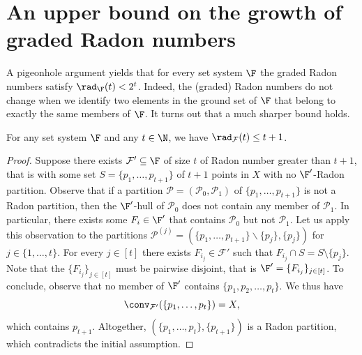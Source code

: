 \section{An upper bound on the growth of graded Radon numbers}\label{app:rab}
%
A pigeonhole argument yields that for every set system $\F$ the graded Radon numbers satisfy $\rad_\F(t)< 2^t$. Indeed, the (graded) Radon numbers do not change when we identify two elements in the ground set of $\F$ that belong to exactly the same members of $\F$. It turns out that a much sharper bound holds.
%
\begin{proposition}
 For any set system $\F$ and any $t \in \N$, we have $\rad_{\mathcal{F}}(t)\leq t+1$.
\end{proposition}
\begin{proof}
  Suppose there exists $\mathcal{F}' \subseteq \F$ of size $t$ of Radon number greater than $t+1$, that is with some set $S=\{p_1,\dots,p_{t+1}\}$ of $t+1$ points in $X$ with no $\F'$-Radon partition.
%
  \medskip
%
  Observe that if a partition $\mathcal{P}=(\mathcal{P}_0,\mathcal{P}_1)$ of $\{p_1,\dots,p_{t+1}\}$ is not a Radon partition, then the $\F'$-hull of $\mathcal{P}_0$ does not contain any member of $\mathcal{P}_1$. In particular, there exists some $F_i\in\F'$ that contains $\mathcal{P}_0$ but not $\mathcal{P}_1$.
%
  \medskip
%
  Let us apply this observation to the partitions $\mathcal{P}^{(j)}=(\{p_1,\dots,p_{t+1}\}\backslash \{p_j\},\{p_j\})$ for $j\in\{1,\dots,t\}$. For every $j \in [t]$ there exists $F_{i_j}\in\mathcal{F}'$ such that $F_{i_j} \cap S = S \setminus \{p_j\}$. Note that the $\{F_{i_j}\}_{j \in [t]}$ must be pairwise disjoint, that is $\F' = \{F_{i_j}\}_{j \in [t]}$.
%
  \medskip
%
  To conclude, observe that no member of $\F'$ contains $\{p_1,p_2, \ldots, p_t\}$. We thus have
  \[ \conv_{\mathcal{F}'}(\{p_1,\dots,p_t\})=X,\]
  which contains $p_{t+1}$. Altogether, $(\{p_1,\dots,p_t\},\{p_{t+1}\})$ is a Radon partition, which contradicts the initial assumption.
\end{proof}
%
